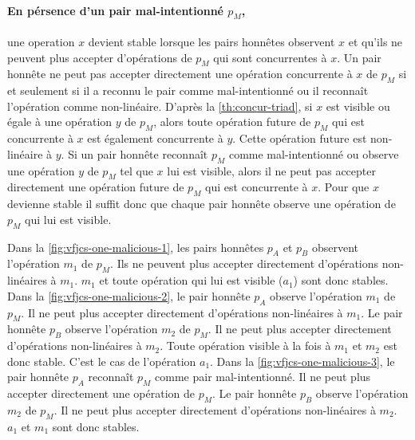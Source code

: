 \paragraph{En pérsence d'un pair mal-intentionné $p_M$,}
une operation $x$ devient stable lorsque les pairs honnêtes observent $x$ et qu'ils ne peuvent plus accepter d'opérations de $p_M$ qui sont concurrentes à $x$.
Un pair honnête ne peut pas accepter directement une opération concurrente à $x$ de $p_M$ si et seulement si il a reconnu le pair comme mal-intentionné ou il reconnaît l'opération comme non-linéaire.
D'après la \autoref{th:concur-triad}, si $x$ est visible ou égale à une opération $y$ de $p_M$, alors toute opération future de $p_M$ qui est concurrente à $x$ est également concurrente à $y$.
Cette opération future est non-linéaire à $y$.
Si un pair honnête reconnaît $p_M$ comme mal-intentionné ou observe une opération $y$ de $p_M$ tel que $x$ lui est visible, alors il ne peut pas accepter directement une opération future de $p_M$ qui est concurrente à $x$.
Pour que $x$ devienne stable il suffit donc que chaque pair honnête observe une opération de $p_M$ qui lui est visible.

Dans la \autoref{fig:vfjcs-one-malicious-1}, les pairs honnêtes $p_A$ et $p_B$ observent l'opération $m_1$ de $p_M$.
Ils ne peuvent plus accepter directement d'opérations non-linéaires à $m_1$.
$m_1$ et toute opération qui lui est visible ($a_1$) sont donc stables.
Dans la \autoref{fig:vfjcs-one-malicious-2}, le pair honnête $p_A$ observe l'opération $m_1$ de $p_M$.
Il ne peut plus accepter directement d'opérations non-linéaires à $m_1$.
Le pair honnête  $p_B$ observe l'opération $m_2$ de $p_M$.
Il ne peut plus accepter directement d'opérations non-linéaires à $m_2$.
Toute opération visible à la fois à $m_1$ et $m_2$ est donc stable.
C'est le cas de l'opération $a_1$.
Dans la \autoref{fig:vfjcs-one-malicious-3}, le pair honnête $p_A$ reconnaît $p_M$ comme pair mal-intentionné.
Il ne peut plus accepter directement une opération de $p_M$.
Le pair honnête  $p_B$ observe l'opération $m_2$ de $p_M$.
Il ne peut plus accepter directement d'opérations non-linéaires à $m_2$.
$a_1$ et $m_1$ sont donc stables.


